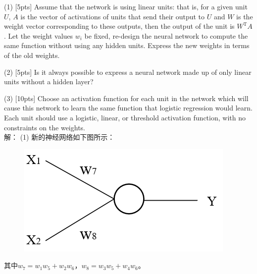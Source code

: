 \documentclass{article}
\begin{document}
	(1) [5pts] Assume that the network is using linear units: that is, for a given unit $U$, $A$ is the vector of activations of units that send their output to $U$ and $W$ is the weight vector corresponding to these outputs, then the output of the unit is $W^{\mathrm{T}}A$. Let the weight values $w_i$ be fixed, re-design the neural network to compute the same function without using any hidden units. Express the new weights in terms of the old weights.
	
	(2) [5pts] Is it always possible to express a neural network made up of only linear units without a hidden layer?
	
	(3) [10pts] Choose an activation function for each unit in the network which will cause this network to learn the same function that logistic regression would learn. Each unit should use a logistic, linear, or threshold activation function, with no constraints on the weights.
	\\
	
	\noindent 解：
	(1) 新的神经网络如下图所示：
	\begin{figure}[htbp]
		\centering
		\includegraphics[scale=0.7]{p2-nn2.png}
	\end{figure}
	
	\noindent 其中$w_7=w_1w_5+w_2w_6$，$w_8=w_3w_5+w_4w_6$。
\end{document}
